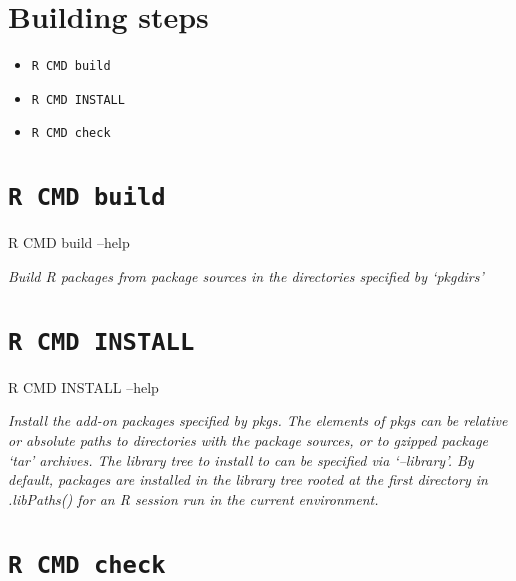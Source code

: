 \documentclass[]{book}
\newenvironment{Shaded}{\begin{snugshade}}{\end{snugshade}}
\newcommand{\NormalTok}[1]{{#1}}
\theoremstyle{definition}
\theoremstyle{definition}
\theoremstyle{definition}
\theoremstyle{remark}
\begin{document}
\section{Building steps}\label{building-steps}

\begin{itemize}
\item
  \texttt{R\ CMD\ build}
\item
  \texttt{R\ CMD\ INSTALL}
\item
  \texttt{R\ CMD\ check}
\end{itemize}

\section{\texorpdfstring{\texttt{R\ CMD\ build}}{R CMD build}}\label{r-cmd-build}

\begin{Shaded}
\begin{Highlighting}[]
\NormalTok{R CMD build --help}
\end{Highlighting}
\end{Shaded}

\emph{Build R packages from package sources in the directories specified
by `pkgdirs'}

\section{\texorpdfstring{\texttt{R\ CMD\ INSTALL}}{R CMD INSTALL}}\label{r-cmd-install}

\begin{Shaded}
\begin{Highlighting}[]
\NormalTok{R CMD INSTALL --help}
\end{Highlighting}
\end{Shaded}

\emph{Install the add-on packages specified by pkgs. The elements of
pkgs can be relative or absolute paths to directories with the package
sources, or to gzipped package `tar' archives. The library tree to
install to can be specified via `--library'. By default, packages are
installed in the library tree rooted at the first directory in
.libPaths() for an R session run in the current environment.}

\section{\texorpdfstring{\texttt{R\ CMD\ check}}{R CMD check}}\label{r-cmd-check}
\end{document}
